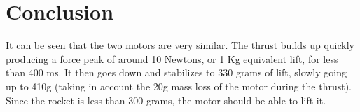 \section*{Conclusion}
It can be seen that the two motors are very similar. The thrust builds up quickly producing a force peak of around 10 Newtons, or 1 Kg equivalent lift, for less than 400 ms. It then goes down and stabilizes to 330 grams of lift, slowly going up to 410g (taking in account the 20g mass loss of the motor during the thrust). Since the rocket is less than 300 grams, the motor should be able to lift it.


